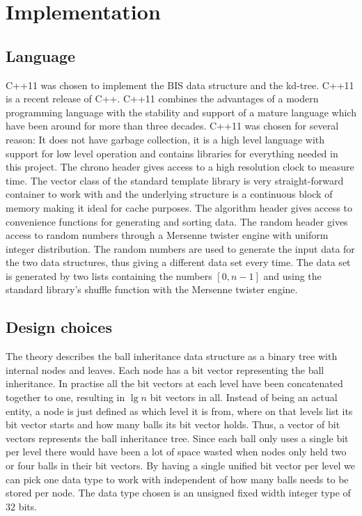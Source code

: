 \chapter{Implementation}
\label{ch:implementation}

\section{Language}

C++11 was chosen to implement the BIS data structure and the kd-tree. C++11 is a recent release of C++. C++11 combines the advantages of a modern programming language with the stability and support of a mature language which have been around for more than three decades. C++11 was chosen for several reason: It does not have garbage collection, it is a high level language with support for low level operation and contains libraries for everything needed in this project. The chrono header gives access to a high resolution clock to measure time. The vector class of the standard template library is very straight-forward container to work with and the underlying structure is a continuous block of memory making it ideal for cache purposes. The algorithm header gives access to convenience functions for generating and sorting data. The random header gives access to random numbers through a Mersenne twister engine with uniform integer distribution. The random numbers are used to generate the input data for the two data structures, thus giving a different data set every time. The data set is generated by two lists containing the numbers $[0,n-1]$ and using the standard library's shuffle function with the Mersenne twister engine. 

\section{Design choices}

The theory describes the ball inheritance data structure as a binary tree with internal nodes and leaves. Each node has a bit vector representing the ball inheritance. In practise all the bit vectors at each level have been concatenated together to one, resulting in $\lg n$ bit vectors in all. Instead of being an actual entity, a node is just defined as which level it is from, where on that levels list its bit vector starts and how many balls its bit vector holds. Thus, a vector of bit vectors represents the ball inheritance tree. Since each ball only uses a single bit per level there would have been a lot of space wasted when nodes only held two or four balls in their bit vectors. By having a single unified bit vector per level we can pick one data type to work with independent of how many balls needs to be stored per node. The data type chosen is an unsigned fixed width integer type of $32$ bits.

